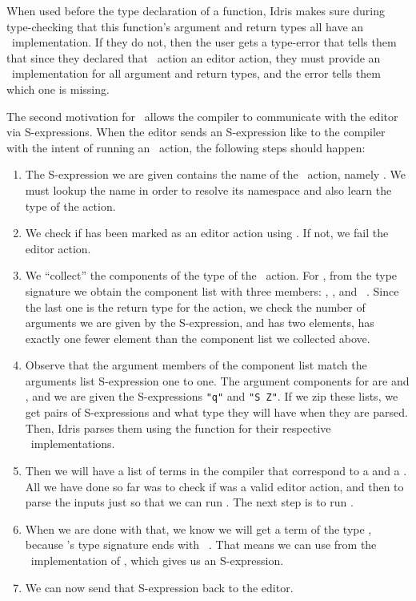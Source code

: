 When used before the type declaration of a function, Idris makes sure during
type-checking that this function's argument and return types all have an
\Editorable\ implementation. If they do not, then the user gets a type-error
that tells them that since they declared that \Elab\ action an editor action,
they must provide an \Editorable\ implementation for all argument and return
types, and the error tells them which one is missing.

The second motivation for \Editorable\ allows the compiler to communicate with
the editor via S-expressions. When the editor sends an S-expression like
 to the
compiler with the intent of running an \Elab\ action,
the following steps should happen:
\begin{enumerate}
  \item The S-expression we are given contains the name of the \Elab\ action,
    namely . We must lookup the name in order to resolve its namespace
    and also learn the type of the action.
  \item We check if  has been marked as an editor action using
    . If not, we fail the editor action.
  \item We ``collect'' the components of the type of the \Elab\ action. For
    , from the type signature
    we obtain the component list with three members: , \TT, and
    \Elab\ \TT.
    Since the last one is the return type for the action, we check the number
    of arguments we are given by the S-expression, and 
    has two elements, has exactly one fewer element than the component list we
    collected above.
  \item Observe that the argument members of the component list match the
    arguments list S-expression one to one. The argument components for
     are  and \TT, and we are given the S-expressions
    \texttt{"q"} and \texttt{"S Z"}. If we zip these lists, we get pairs of
    S-expressions and what type they will have when they are parsed.
    Then, Idris parses them using the  function for their respective
    \Editorable\ implementations.
  \item Then we will have a list of terms in the compiler that correspond to a
     and a \TT.  All we have done so far was to check if 
    was a valid editor action, and then to parse the inputs just so that we can
    run . The next step is to run .
  \item When we are done with that, we know we will get a term of the type \TT,
    because 's type signature ends with \texttt{\Elab\ \TT}. That means
    we can use  from the \Editorable\ implementation of \TT, which
    gives us an S-expression.
  \item We can now send that S-expression back to the editor.
\end{enumerate}

